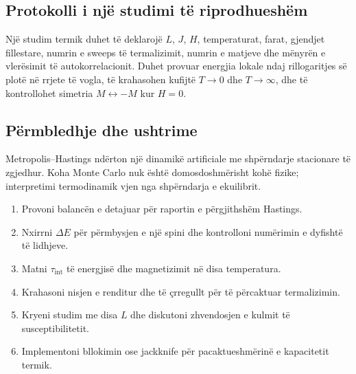 \subsection{Protokolli i një studimi të riprodhueshëm}
Një studim termik duhet të deklarojë $L$, $J$, $H$, temperaturat, farat, gjendjet fillestare, numrin e sweeps të termalizimit, numrin e matjeve dhe mënyrën e vlerësimit të autokorrelacionit. Duhet provuar energjia lokale ndaj rillogaritjes së plotë në rrjete të vogla, të krahasohen kufijtë $T\to0$ dhe $T\to\infty$, dhe të kontrollohet simetria $M\leftrightarrow-M$ kur $H=0$.

\subsection{Përmbledhje dhe ushtrime}
Metropolis--Hastings ndërton një dinamikë artificiale me shpërndarje stacionare të zgjedhur. Koha Monte Carlo nuk është domosdoshmërisht kohë fizike; interpretimi termodinamik vjen nga shpërndarja e ekuilibrit.
\begin{enumerate}
\item Provoni balancën e detajuar për raportin e përgjithshëm Hastings.
\item Nxirrni $\Delta E$ për përmbysjen e një spini dhe kontrolloni numërimin e dyfishtë të lidhjeve.
\item Matni $\tau_{\mathrm{int}}$ të energjisë dhe magnetizimit në disa temperatura.
\item Krahasoni nisjen e renditur dhe të çrregullt për të përcaktuar termalizimin.
\item Kryeni studim me disa $L$ dhe diskutoni zhvendosjen e kulmit të susceptibilitetit.
\item Implementoni bllokimin ose jackknife për pacaktueshmërinë e kapacitetit termik.
\end{enumerate}

